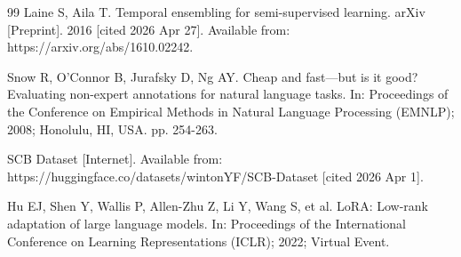 \documentclass[10pt,letterpaper]{article}
\begin{document}
\begin{thebibliography}{99}
Laine S, Aila T.
Temporal ensembling for semi-supervised learning.
arXiv [Preprint]. 2016 [cited 2026 Apr 27]. Available from:
https://arxiv.org/abs/1610.02242.

Snow R, O'Connor B, Jurafsky D, Ng AY.
Cheap and fast---but is it good? Evaluating non-expert annotations
for natural language tasks.
In: Proceedings of the Conference on Empirical Methods in Natural
Language Processing (EMNLP); 2008; Honolulu, HI, USA. pp. 254-263.

SCB Dataset [Internet]. Available from:
https://huggingface.co/datasets/wintonYF/SCB-Dataset [cited 2026 Apr 1].

Hu EJ, Shen Y, Wallis P, Allen-Zhu Z, Li Y, Wang S, et al.
LoRA: Low-rank adaptation of large language models.
In: Proceedings of the International Conference on Learning
Representations (ICLR); 2022; Virtual Event.

\end{thebibliography}
\end{document}
